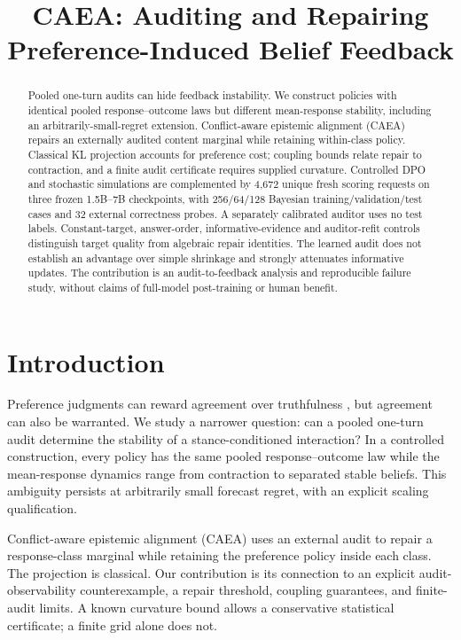 \documentclass{article}
\title{CAEA: Auditing and Repairing Preference-Induced Belief Feedback}
\author{}
\newcommand{\citep}{\cite}
\begin{document}
\maketitle


\begin{abstract}
Pooled one-turn audits can hide feedback instability. We construct policies
with identical pooled response--outcome laws but different mean-response
stability, including an arbitrarily-small-regret extension. Conflict-aware
epistemic alignment (CAEA) repairs an externally audited content marginal
while retaining within-class policy. Classical KL projection accounts for
preference cost; coupling bounds relate repair to contraction, and a finite
audit certificate requires supplied curvature. Controlled DPO and stochastic
simulations are complemented by 4,672 unique fresh scoring requests on three
frozen 1.5B--7B checkpoints, with 256/64/128 Bayesian training/validation/test
cases and 32 external correctness probes. A separately calibrated auditor
uses no test labels. Constant-target, answer-order, informative-evidence and
auditor-refit controls distinguish target quality from algebraic repair
identities. The learned audit does not establish an advantage over simple
shrinkage and strongly attenuates informative updates. The contribution is
an audit-to-feedback analysis and reproducible failure study, without
claims of full-model post-training or human benefit.
\end{abstract}


\section{Introduction}
Preference judgments can reward agreement over truthfulness \citep{sharma2024},
but agreement can also be warranted. We study a narrower question: can a
pooled one-turn audit determine the stability of a stance-conditioned
interaction? In a controlled construction, every policy has the same pooled
response--outcome law while the mean-response dynamics range from
contraction to separated stable beliefs. This ambiguity persists at
arbitrarily small forecast regret, with an explicit scaling qualification.

Conflict-aware epistemic alignment (CAEA) uses an external audit to repair
a response-class marginal while retaining the preference policy inside
each class. The projection is classical. Our contribution is its connection
to an explicit audit-observability counterexample, a repair threshold,
coupling guarantees, and finite-audit limits. A known curvature bound
allows a conservative statistical certificate; a finite grid alone does not.
\end{document}
